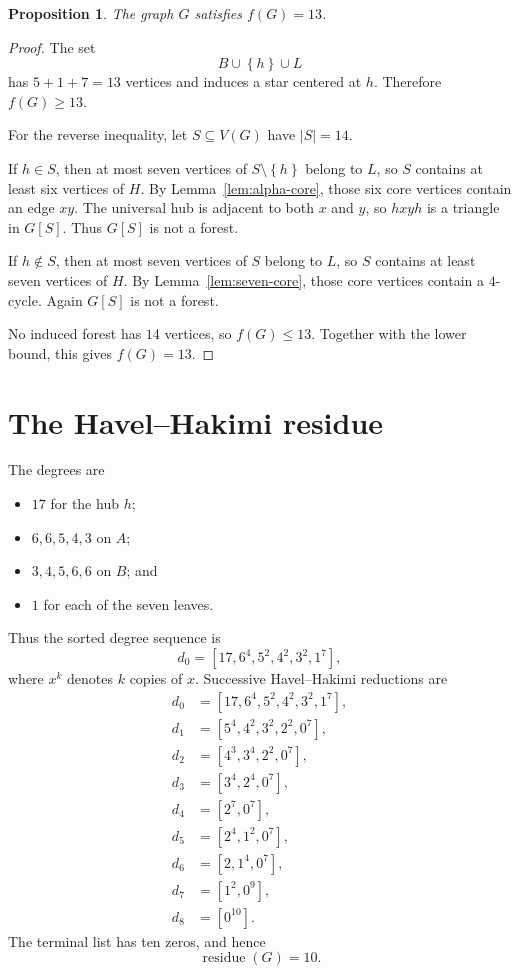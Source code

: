\documentclass[11pt]{article}
\newtheorem{proposition}[theorem]{Proposition}
\newcommand{\res}{\operatorname{residue}}
\newcommand{\set}[1]{\left\{#1\right\}}
\begin{document}
\begin{proposition}\label{prop:f}
The graph $G$ satisfies $f(G)=13$.
\end{proposition}

\begin{proof}
The set
\[
 B\cup\set{h}\cup L
\]
has $5+1+7=13$ vertices and induces a star centered at $h$. Therefore
$f(G)\ge13$.

For the reverse inequality, let $S\subseteq V(G)$ have $|S|=14$.

If $h\in S$, then at most seven vertices of $S\setminus\set{h}$ belong to
$L$, so $S$ contains at least six vertices of $H$. By
Lemma~\ref{lem:alpha-core}, those six core vertices contain an edge $xy$.
The universal hub is adjacent to both $x$ and $y$, so $hxyh$ is a triangle in
$G[S]$. Thus $G[S]$ is not a forest.

If $h\notin S$, then at most seven vertices of $S$ belong to $L$, so $S$
contains at least seven vertices of $H$. By Lemma~\ref{lem:seven-core}, those
core vertices contain a $4$-cycle. Again $G[S]$ is not a forest.

No induced forest has $14$ vertices, so $f(G)\le13$. Together with the lower
bound, this gives $f(G)=13$.
\end{proof}

\section{The Havel--Hakimi residue}

The degrees are
\begin{itemize}[leftmargin=2em]
  \item $17$ for the hub $h$;
  \item $6,6,5,4,3$ on $A$;
  \item $3,4,5,6,6$ on $B$; and
  \item $1$ for each of the seven leaves.
\end{itemize}
Thus the sorted degree sequence is
\[
 d_0=[17,6^4,5^2,4^2,3^2,1^7],
\]
where $x^k$ denotes $k$ copies of $x$. Successive Havel--Hakimi reductions are
\begin{align*}
 d_0&=[17,6^4,5^2,4^2,3^2,1^7],\\
 d_1&=[5^4,4^2,3^2,2^2,0^7],\\
 d_2&=[4^3,3^4,2^2,0^7],\\
 d_3&=[3^4,2^4,0^7],\\
 d_4&=[2^7,0^7],\\
 d_5&=[2^4,1^2,0^7],\\
 d_6&=[2,1^4,0^7],\\
 d_7&=[1^2,0^9],\\
 d_8&=[0^{10}].
\end{align*}
The terminal list has ten zeros, and hence
\begin{equation}\label{eq:residue}
  \res(G)=10.
\end{equation}
\end{document}
